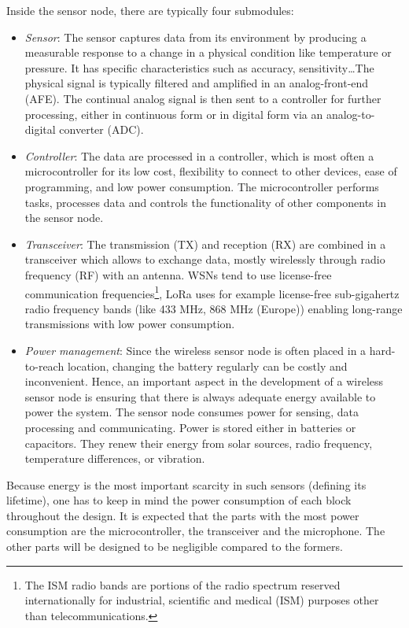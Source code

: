 \documentclass{EPL-master-thesis-covers-EN}
\begin{document}
Inside the sensor node, there are typically four submodules:
\begin{itemize}
 \item \textit{Sensor}: The sensor captures data from its environment by producing a measurable response to a change in a physical condition like temperature or pressure. It has specific characteristics such as accuracy, sensitivity\dots The physical signal is typically filtered and amplified in an analog-front-end (AFE). The continual analog signal is then sent to a controller for further processing, either in continuous form or in digital form via an analog-to-digital converter (ADC).
 \item \textit{Controller}: The data are processed in a controller, which is most often a microcontroller for its low cost, flexibility to connect to other devices, ease of programming, and low power consumption. The microcontroller performs tasks, processes data and controls the functionality of other components in the sensor node.
 \item \textit{Transceiver}: The transmission (TX) and reception (RX) are combined in a transceiver which allows to exchange data, mostly wirelessly through radio frequency (RF) with an antenna. WSNs tend to use license-free communication frequencies\footnote{The ISM radio bands are portions of the radio spectrum reserved internationally for industrial, scientific and medical (ISM) purposes other than telecommunications.}, LoRa uses for example license-free sub-gigahertz radio frequency bands (like 433 MHz, 868 MHz (Europe)) enabling long-range transmissions with low power consumption.
 \item \textit{Power management}: Since the wireless sensor node is often placed in a hard-to-reach location, changing the battery regularly can be costly and inconvenient. Hence, an important aspect in the development of a wireless sensor node is ensuring that there is always adequate energy available to power the system. The sensor node consumes power for sensing, data processing and communicating. Power is stored either in batteries or capacitors. They renew their energy from solar sources, radio frequency, temperature differences, or vibration.
\end{itemize}

Because energy is the most important scarcity in such sensors (defining its lifetime), one has to keep in mind the power consumption of each block throughout the design. It is expected that the parts with the most power consumption are the microcontroller, the transceiver and the microphone. The other parts will be designed to be negligible compared to the formers.
\end{document}
